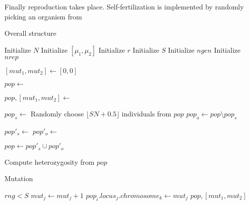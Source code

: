\documentclass[12pt]{article}
\begin{document}
Finally reproduction takes place.
Self-fertilization is implemented by randomly picking an organism from


\begin{algorithm}
  \caption{Overall structure}
  \label{algo:overall}
  \begin{algorithmic}
    \State Initialize \(N\) 
    \State Initialize \([\mu_{1}, \mu_{2}]\) 
    \State Initialize \(r\) 
    \State Initialize \(S\) 
    \State Initialize \(ngen\) 
    \State Initialize \(nrep\) 

  \item


    \State \([mut_{1}, mut_{2}] \gets [0, 0]\)

    \State \(pop \gets\)  


    \State \(pop, [mut_{1}, mut_{2}] \gets\) 
  \item
    \State \(pop_{s} \gets\) Randomly choose \(\lfloor S N + 0.5
    \rfloor\) individuals from \(pop\)
    \State \(pop_{o} \gets pop \setminus pop_{s}\)

  \item
    \State \(pop'_{s} \gets\) 
    \State \(pop'_{o} \gets\) 

  \item
    \State \(pop \gets pop'_{s} \cup pop'_{o}\)

    \EndFor

    \State Compute heterozygosity from \(pop\)

    \EndFor

  \end{algorithmic}
\end{algorithm}

\begin{algorithm}
  \caption{Mutation}
  \label{algo:mutation}
  \begin{algorithmic}
     
     
    \If \(rng < S\)
    \State \(mut_{j} \gets mut_{j} + 1\)
    \State \(pop_{i}.locus_{j}.chromosome_{k} \gets mut_{j}\)
    \EndIf
    \EndFor
    \EndFor
    \EndFor
    \State \Return \(pop, [mut_{1}, mut_{2}]\)
    \EndFunction
  \end{algorithmic}
\end{algorithm}
\end{document}

